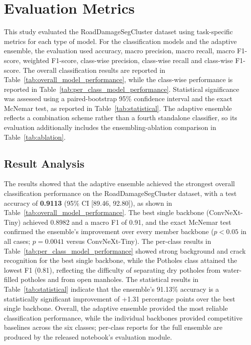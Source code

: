 \documentclass{article}
\begin{document}
\section*{Evaluation Metrics}
This study evaluated the RoadDamageSegCluster dataset using task-specific metrics for each type of model. For the classification models and the adaptive ensemble, the evaluation used accuracy, macro precision, macro recall, macro F1-score, weighted F1-score, class-wise precision, class-wise recall and class-wise F1-score. The overall classification results are reported in Table~\ref{tab:overall_model_performance}, while the class-wise performance is reported in Table~\ref{tab:per_class_model_performance}. Statistical significance was assessed using a paired-bootstrap 95\% confidence interval and the exact McNemar test, as reported in Table~\ref{tab:statistical}. The adaptive ensemble reflects a combination scheme rather than a fourth standalone classifier, so its evaluation additionally includes the ensembling-ablation comparison in Table~\ref{tab:ablation}.

\subsection*{Result Analysis}
The results showed that the adaptive ensemble achieved the strongest overall classification performance on the RoadDamageSegCluster dataset, with a test accuracy of \textbf{0.9113} (95\% CI [89.46, 92.80]), as shown in Table~\ref{tab:overall_model_performance}. The best single backbone (ConvNeXt-Tiny) achieved 0.8982 and a macro F1 of 0.91, and the exact McNemar test confirmed the ensemble's improvement over every member backbone ($p<0.05$ in all cases; $p=0.0041$ versus ConvNeXt-Tiny). The per-class results in Table~\ref{tab:per_class_model_performance} showed strong background and crack recognition for the best single backbone, while the Potholes class attained the lowest F1 (0.81), reflecting the difficulty of separating dry potholes from water-filled potholes and from open manholes. The statistical results in Table~\ref{tab:statistical} indicate that the ensemble's 91.13\% accuracy is a statistically significant improvement of +1.31 percentage points over the best single backbone. Overall, the adaptive ensemble provided the most reliable classification performance, while the individual backbones provided competitive baselines across the six classes; per-class reports for the full ensemble are produced by the released notebook's evaluation module.
\end{document}
